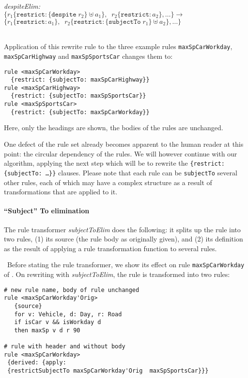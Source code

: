 \noindent
\emph{despiteElim:}\\
$
\{r_1 \{\mathtt{restrict}: \{\mathtt{despite}\; r_2\} \uplus a_1\},\;\;
r_2\{\mathtt{restrict}: a_2\}, \dots\} \longrightarrow$\\
$\{r_1 \{\mathtt{restrict}: a_1\},\;\;
r_2\{\mathtt{restrict}:  \{\mathtt{subjectTo}\; r_1\} \uplus a_2\}, \dots\}
$

\begin{example}\label{ex:rewrite_despite}\mbox{}\\
Application of this rewrite rule to the three example rules \texttt{maxSpCarWorkday},
\texttt{maxSpCarHighway} and  \texttt{maxSpSportsCar} changes them to:

\begin{lstlisting}
rule <maxSpCarWorkday>
  {restrict: {subjectTo: maxSpCarHighway}}
rule <maxSpCarHighway>
  {restrict: {subjectTo: maxSpSportsCar}}
rule <maxSpSportsCar>
  {restrict: {subjectTo: maxSpCarWorkday}}
\end{lstlisting}
Here, only the headings are shown, the bodies of the rules are
unchanged. 
\end{example}

One defect of the rule set already becomes apparent to the human reader at
this point: the circular dependency of the rules. We will however continue
with our algorithm, applying the next step which will be to rewrite the
\texttt{\{restrict: \{subjectTo: \dots\}\}} clauses.  Please note that each
rule can be \texttt{subjectTo} several other rules, each of which may have a
complex structure as a result of transformations that are applied to it.


\paragraph{\textbf{``Subject'' To elimination}}

The rule transformer \emph{subjectToElim} does the following: it splits up the
rule into two rules, (1) its source (the rule body as originally given), and
(2) its definition as the result of applying a rule transformation function to
several rules.

\begin{example}\label{ex:rewrite_subject_to}\
Before stating the rule transformer, we show its effect on rule
\texttt{maxSpCarWorkday} of . On rewriting
with \emph{subjectToElim}, the rule is transformed into two rules:

\begin{lstlisting}
# new rule name, body of rule unchanged
rule <maxSpCarWorkday'Orig>
   {source}
   for v: Vehicle, d: Day, r: Road
   if isCar v && isWorkday d
   then maxSp v d r 90

# rule with header and without body
rule <maxSpCarWorkday>
 {derived: {apply: 
 {restrictSubjectTo maxSpCarWorkday'Orig  maxSpSportsCar}}}
\end{lstlisting}
\end{example}

